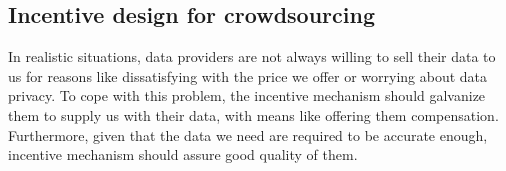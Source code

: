 \documentclass[10pt,conference,compsocconf,letterpaper]{IEEEtran}
\begin{document}
\subsection{Incentive design for crowdsourcing}
In realistic situations, data providers are not always willing to sell their data to us for reasons like dissatisfying with the price we offer %
or worrying about data privacy. To cope with this problem, the incentive mechanism should galvanize them to supply us with their data, with means like offering them compensation. Furthermore, given that the data we need are required to be accurate enough, incentive mechanism should assure good quality of them. %
\end{document}
